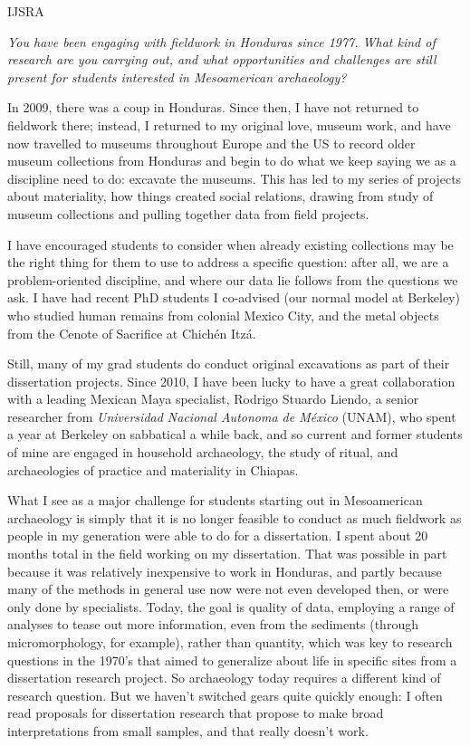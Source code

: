 \begin{labeling}{IJSRA}
\item[IJSRA] \emph{You have been engaging with fieldwork in Honduras since 1977. What kind of research are you carrying out, and what opportunities and challenges are still present for students interested in Mesoamerican archaeology?}

\item[RAJ] In 2009, there was a coup in Honduras. Since then, I have not returned to fieldwork there; instead, I returned to my original love, museum work, and have now travelled to museums throughout Europe and the US to record older museum collections from Honduras and begin to do what we keep saying we as a discipline need to do: excavate the museums. This has led to my series of projects about materiality, how things created social relations, drawing from study of museum collections and pulling together data from field projects.

  I have encouraged students to consider when already existing collections may be the right thing for them to use to address a specific question: after all, we are a problem-oriented discipline, and where our data lie follows from the questions we ask. I have had recent PhD students I co-advised (our normal model at Berkeley) who studied human remains from colonial Mexico City, and the metal objects from the Cenote of Sacrifice at Chichén Itzá.
  
  Still, many of my grad students do conduct original excavations as part of their dissertation projects. Since 2010, I have been lucky to have a great collaboration with a leading Mexican Maya specialist, Rodrigo Stuardo Liendo, a senior researcher from \emph{Universidad Nacional Autonoma de México} (UNAM), who spent a year at Berkeley on sabbatical a while back, and so current and former students of mine are engaged in household archaeology, the study of ritual, and archaeologies of practice and materiality in Chiapas.
  
 What I see as a major challenge for students starting out in Mesoamerican archaeology is simply that it is no longer feasible to conduct as much fieldwork as people in my generation were able to do for a dissertation. I spent about 20 months total in the field working on my dissertation. That was possible in part because it was relatively inexpensive to work in Honduras, and partly because many of the methods in general use now were not even developed then, or were only done by specialists. Today, the goal is quality of data, employing a range of analyses to tease out more information, even from the sediments (through micromorphology, for example), rather than quantity, which was key to research questions in the 1970's that aimed to generalize about life in specific sites from a dissertation research project. So archaeology today requires a different kind of research question. But we haven't switched gears quite quickly enough: I often read proposals for dissertation research that propose to make broad interpretations from small samples, and that really doesn't work.


\end{labeling}
